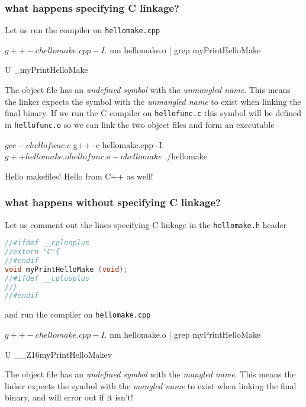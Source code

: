 \documentclass[smaller,a4paper]{beamer}
\begin{document}
\begin{frame}[fragile]\frametitle{what happens specifying C linkage?}
Let us run the compiler on \lstinline[language=bash]|hellomake.cpp|

\begin{bashcommand}
$ g++ -c hellomake.cpp -I.
$ nm hellomake.o | grep myPrintHelloMake
\end{bashcommand}
\begin{bashoutput}
                 U _myPrintHelloMake
\end{bashoutput}
The object file has an \emph{undefined symbol} with the \emph{unmangled name}.
This means the linker expects the symbol with the \emph{unmangled name} to exist
when linking the final binary. 
If we run the C compiler on  \lstinline[language=bash]|hellofunc.c| this 
symbol will be defined in \lstinline[language=bash]|hellofunc.o| so we can link the two object files and form an executable
\begin{bashcommand}
$ gcc -c hellofunc.c
$ g++ -c hellomake.cpp -I.
$ g++ hellomake.o hellofunc.o -o hellomake
$ ./hellomake 
\end{bashcommand}
\begin{bashoutput}
Hello makefiles!
Hello from C++ as well!
\end{bashoutput}
\end{frame}


\begin{frame}[fragile]\frametitle{what happens without specifying C linkage?}
Let us comment out the lines specifying C linkage in the \lstinline[language=bash]|hellomake.h|
header 
\begin{lstlisting}[language=C++]
//#ifdef __cplusplus
//extern "C"{
//#endif
void myPrintHelloMake (void);
//#ifdef __cplusplus
//}
//#endif
\end{lstlisting}

and run the compiler on \lstinline[language=bash]|hellomake.cpp|

\begin{bashcommand}
$ g++ -c hellomake.cpp -I.
$ nm hellomake.o | grep myPrintHelloMake
\end{bashcommand}
\begin{bashoutput}
                 U __Z16myPrintHelloMakev
\end{bashoutput}
The object file has an \emph{undefined symbol} with the \emph{mangled name}.
This means the linker expects the symbol with the \emph{mangled name} to exist
when linking the final binary, and will error out if it isn't!

\end{frame}
\end{document}
